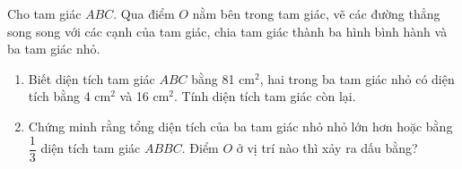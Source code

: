\begin{bt}%
	Cho tam giác $ABC$. Qua điểm $O$ nằm bên trong tam giác, vẽ các đường thẳng song song với các cạnh của tam giác, chia tam giác thành ba hình bình hành và ba tam giác nhỏ.
	\begin{enumerate}
		\item Biết diện tích tam giác $ABC$ bằng 81 cm$^2$, hai trong ba tam giác nhỏ có diện tích bằng 4 cm$^2$ và 16 cm$^2$. Tính diện tích tam giác còn lại.
		\item Chứng minh rằng tổng diện tích của ba tam giác nhỏ nhỏ lớn hơn hoặc bằng $\dfrac{1}{3}$ diện tích tam giác $ABBC$. Điểm $O$ ở vị trí nào thì xảy ra dấu bằng?
	\end{enumerate} 
\end{bt}
